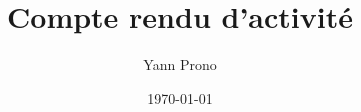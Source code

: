 \documentclass[a4paper,11pt, oneside]{book}
\title{Compte rendu d'activité}
\author{Yann Prono}
\date{\today}
\begin{document}
	\begin{titlepage}
		
	\end{titlepage}

	\newpage

	\newpage\null\thispagestyle{empty}\newpage
	\setcounter{page}{1}

	

	\clearpage
\end{document}
